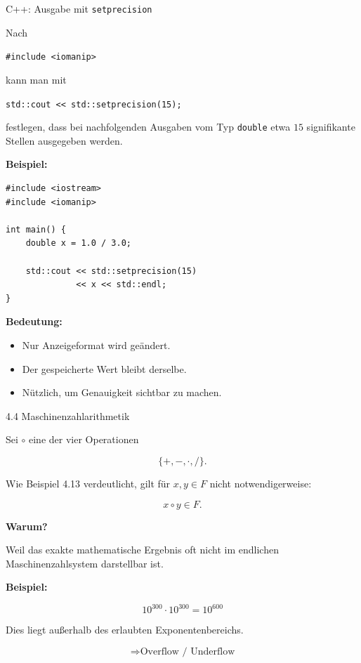 \documentclass{beamer}
\begin{document}
\begin{frame}[fragile]{C++: Ausgabe mit \texttt{setprecision}}

\scriptsize

Nach

\texttt{\#include <iomanip>}

kann man mit

\texttt{std::cout << std::setprecision(15);}

festlegen, dass bei nachfolgenden Ausgaben vom Typ
\texttt{double} etwa \(15\) signifikante Stellen
ausgegeben werden.

\vspace{0.4cm}

\textbf{Beispiel:}

\begin{verbatim}
#include <iostream>
#include <iomanip>

int main() {
    double x = 1.0 / 3.0;

    std::cout << std::setprecision(15)
              << x << std::endl;
}
\end{verbatim}

\vspace{0.2cm}

\textbf{Bedeutung:}

\begin{itemize}
\item Nur Anzeigeformat wird geändert.
\item Der gespeicherte Wert bleibt derselbe.
\item Nützlich, um Genauigkeit sichtbar zu machen.
\end{itemize}

\end{frame}

\begin{frame}{4.4 Maschinenzahlarithmetik}

\small

Sei \(\circ\) eine der vier Operationen

\[
\{+,-,\cdot,/\}.
\]

Wie Beispiel 4.13 verdeutlicht, gilt für \(x,y\in F\) nicht notwendigerweise:

\[
x\circ y \in F.
\]

\vspace{0.5cm}

\textbf{Warum?}

Weil das exakte mathematische Ergebnis oft nicht im endlichen
Maschinenzahlsystem darstellbar ist.

\vspace{0.6cm}

\textbf{Beispiel:}

\[
10^{300}\cdot 10^{300}=10^{600}
\]

Dies liegt außerhalb des erlaubten Exponentenbereichs.

\vspace{0.3cm}

\[
\Rightarrow \text{Overflow / Underflow}
\]

\end{frame}
\end{document}

